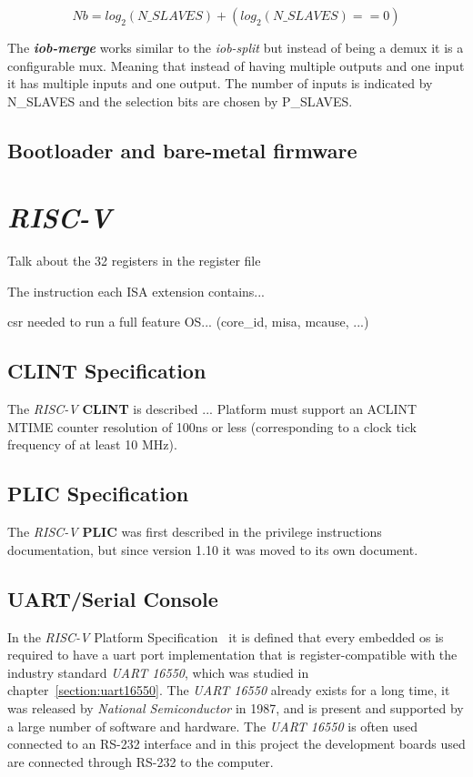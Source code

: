 \begin{equation}
    \label{eq:number_bits}
    Nb = log_2(N\_SLAVES)+(log_2(N\_SLAVES)==0)
\end{equation}

The \textbf{\textit{iob-merge}} works similar to the \textit{iob-split} but instead of being a \acrshort{demux} it is a configurable \acrfull{mux}. Meaning that instead of having multiple outputs and one input it has multiple inputs and one output. The number of inputs is indicated by N\_SLAVES and the selection bits are chosen by P\_SLAVES.

\subsection{Bootloader and bare-metal firmware}

\section{\textit{RISC-V}}
\label{section:riscv}
Talk about the 32 registers in the register file

The instruction each ISA extension contains...

\acrfull{csr} needed to run a full feature OS... (core\_id, misa, mcause, ...)

\subsection{CLINT Specification}
The \textit{RISC-V} \textbf{CLINT} is described ...
Platform must support an ACLINT MTIME counter resolution of 100ns or less (corresponding to a clock tick frequency of at least 10 MHz).

\subsection{PLIC Specification}
The \textit{RISC-V} \textbf{PLIC} was first described in the privilege instructions documentation, but since version 1.10 it was moved to its own document.

\subsection{UART/Serial Console}
\label{section:serial_console}
In the \textit{RISC-V} Platform Specification~\cite{riscv_platform_specification} it is defined that every embedded \acrfull{os} is required to have a \acrshort{uart} port implementation that is register-compatible with the industry standard \textit{UART 16550}, which was studied in chapter~\ref{section:uart16550}. The \textit{UART 16550} already exists for a long time, it was released by \textit{National Semiconductor} in 1987, and is present and supported by a large number of software and hardware. The \textit{UART 16550} is often used connected to an RS-232 interface and in this project the development boards used are connected through RS-232 to the computer.

